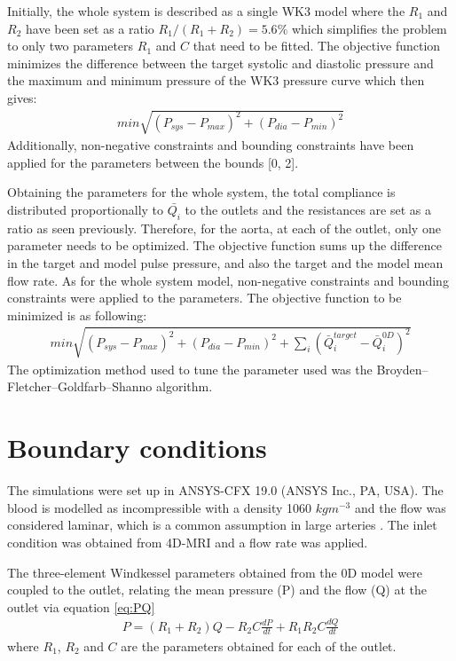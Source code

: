 Initially, the whole system is described as a single WK3 model where the $R_1$ and $R_2$ have been set as a ratio $R_1/(R_1+R_2) = 5.6\%$ which simplifies the problem to only two parameters $R_1$ and $C$ that need to be fitted. The objective function minimizes the difference between the target systolic and diastolic pressure and the maximum and minimum pressure of the WK3 pressure curve which then gives:
\begin{align}
    min \sqrt{(P_{sys}-P_{max})^2+(P_{dia}-P_{min})^2}
\end{align}
 Additionally, non-negative constraints and bounding constraints have been applied for the parameters between the bounds [0, 2]. \par

Obtaining the parameters for the whole system, the total compliance is distributed proportionally to $\bar{Q_i}$ to the outlets and the resistances are set as a ratio as seen previously. Therefore, for the aorta, at each of the outlet, only one parameter needs to be optimized. The objective function sums up the difference in the target and model pulse pressure, and also the target and the model mean flow rate. As for the whole system model, non-negative constraints and bounding constraints were applied to the parameters. The objective function to be minimized is as following:
\begin{align}
    min \sqrt{(P_{sys}-P_{max})^2+(P_{dia}-P_{min})^2+\sum_{i}(\bar{Q}_{i}^{target}-\bar{Q}_{i}^{0D})^2}
\end{align}
The optimization method used to tune the parameter used was the Broyden–Fletcher–Goldfarb–Shanno algorithm.

\section{Boundary conditions}
The simulations were set up in ANSYS-CFX 19.0 (ANSYS Inc., PA, USA). The blood is modelled as incompressible with a density 1060 $kg m^{-3}$ and the flow was considered laminar, which is a common assumption in large arteries \cite{Alimohammadi2014DevelopmentConditions,Bonfanti2017ComputationalData}. The inlet condition was obtained from 4D-MRI and a flow rate was applied.\par

The three-element Windkessel parameters obtained from the 0D model were coupled to the outlet, relating the mean pressure (P) and the flow (Q) at the outlet via equation \ref{eq:PQ}
\begin{align}
    P=(R_1+R_2)Q-R_2C\frac{dP}{dt}+R_1R_2C\frac{dQ}{dt}
    \label{eq:PQ}
\end{align}
where $R_1$, $R_2$ and $C$ are the parameters obtained for each of the outlet. \par

